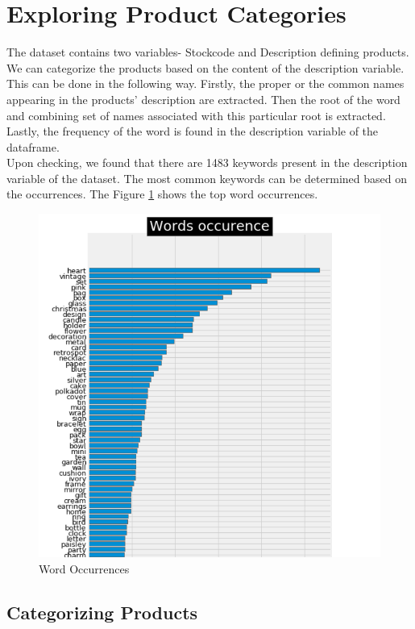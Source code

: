 \section{Exploring Product Categories}

The dataset contains two variables- Stockcode and Description defining products. We can categorize the products based on the content of the description variable. This can be done in the following way. Firstly, the proper or the common names appearing in the products' description are extracted. Then the root of the word and combining set of names associated with this particular root is extracted. Lastly, the frequency of the word is found in the description variable of the dataframe.\\
Upon checking, we found that there are 1483 keywords present in the description variable of the dataset. The most common keywords can be determined based on the occurrences. The Figure \ref{3.1} shows the top word occurrences.
 
 \begin{figure}
\caption{Word Occurrences}
\label{3.1}
\centering
\includegraphics[width=\columnwidth]{images/3_1.PNG}
\end{figure}

\subsection{Categorizing Products}

